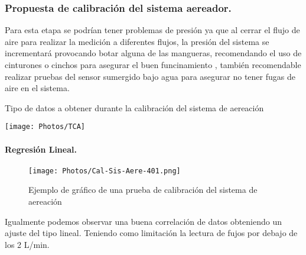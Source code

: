 \documentclass[11pt,letter
								]
								{article}
\begin{document}
\subsubsection{Propuesta  de calibración del sistema aereador.}

Para esta etapa se podrían tener problemas de  %
presión ya 
que al cerrar el flujo de aire para realizar la medición a diferentes flujos, la presión del sistema se incrementará provocando  botar  alguna de las mangueras, recomendando el uso de cinturones o cinchos para asegurar el buen funcinamiento , también recomendable realizar pruebas del sensor sumergido bajo agua para asegurar no tener fugas de aire en el sistema.%

\begin{table}[H]
\centering

\caption{Tipo de datos  a obtener durante la  calibración del sistema de aereación}
\texttt{[image: Photos/TCA]}

\end{table}


			\paragraph{Regresión Lineal.}

\begin{figure}[H]
\centering
\texttt{[image: Photos/Cal-Sis-Aere-401.png]}
\caption{Ejemplo de gráfico de una prueba de calibración del sistema de aereación  }
\end{figure}

Igualmente podemos observar una buena correlación de datos obteniendo un ajuste del tipo lineal. Teniendo como limitación la lectura de fujos por debajo de los 2 L/min. 
\end{document}
